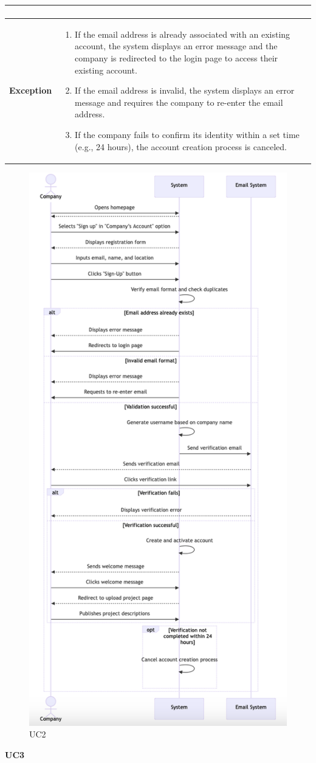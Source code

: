 \begin{longtable}{|p{}|p{}|}
\begin{enumerate}
\end{enumerate}\\
\hline
\textbf{Exception} & 
\begin{enumerate}
    \item If the email address is already associated with an existing account, the system displays an error message and the company is redirected to the login page to access their existing account. 
    \item If the email address is invalid, the system displays an error message and requires the company to re-enter the email address.
    \item If the company fails to confirm its identity within a set time (e.g., 24 hours), the account creation process is canceled.
\end{enumerate}\\
\hline
\end{longtable}

\begin{figure}[H]
    \centering
    \includegraphics[width=0.65\linewidth]{RASD//Images/UC2.png}
    \caption{UC2}
\end{figure}
\pagebreak
\textbf{UC3}

